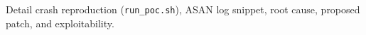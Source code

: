 Detail crash reproduction (\texttt{run\_poc.sh}), ASAN log snippet, root cause,
proposed patch, and exploitability.
